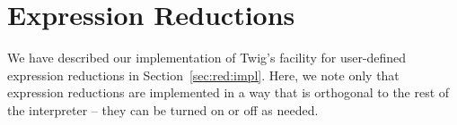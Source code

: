\section{Expression Reductions}
\label{sec:impl:reductions}

We have described our implementation of Twig's facility for
user-defined expression reductions in Section~\ref{sec:red:impl}.
Here, we note only that expression reductions are implemented in a
way that is orthogonal to the rest of the interpreter -- they can
be turned on or off as needed.

